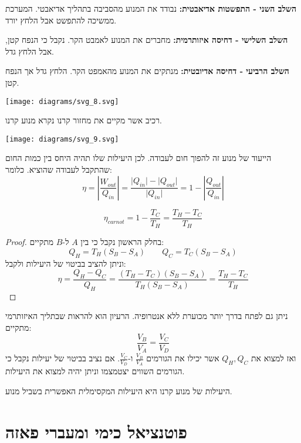 \documentclass{tstextbook}
\begin{document}
\textbf{השלב השני - התפשטות אדיאבטית:}
נבודד את המנוע מהסביבה בתהליך אדיאבטי. המערכת ממשיכה להתפשט אבל הלחץ יורד.

\textbf{השלב השלישי - דחיסה איזותרמית:}
מחברים את המנוע לאמבט הקר. נקבל כי הנפח קטן, אבל הלחץ גדל.

\textbf{השלב הרביעי - דחיסה אדיובטית:}
מנתקים את המנוע מהאמפט הקר. הלחץ גדל אך הנפח קטן.

\texttt{[image: diagrams/svg\_8.svg]}
\begin{definition}
רכיב אשר מקיים את מחזור קרנו נקרא מנוע קרנו.

\end{definition}
\texttt{[image: diagrams/svg\_9.svg]}
\begin{definition}[יעילות]
הייעוד של מנוע זה להפוך חום לעבודה. לכן היעילות שלו תהיה היחס בין כמות החום שהתקבל לעבודה שהוציא. כלומר:
$$\eta = \left\lvert  \frac{W_{out}}{Q_{in}}  \right\rvert = \frac{\lvert Q_{in} \rvert -\lvert Q_{out} \rvert}{\lvert Q_{in} \rvert }=1-\left\lvert  \frac{Q_{out}}{Q_{in}}  \right\rvert  $$

\end{definition}
\begin{proposition}
$$\eta_{carnot}=1-\frac{T_{C}}{T_{H}}=\frac{T_{H}-T_{C}}{T_{H}}$$

\end{proposition}
\begin{proof}
בחלק הראשון נקבל כי בין \(A\) ל-\(B\) מתקיים:
$$Q_{H}=T_{H}(S_{B}-S_{A}) \qquad Q_{C}=T_{C}(S_{B}-S_{A})$$
וניתן להציב בביטוי של היעילות ולקבל:
$$\eta = \frac{Q_{H} - Q_{C}}{Q_{H}}= \frac{(T_{H}-T_{C})(S_{B}-S_{A})}{T_{H}(S_{B}-S_{A})}=\frac{T_{H}-T_{C}}{T_{H}}$$

\end{proof}
\begin{remark}
ניתן גם לפתח בדרך יותר מכוערת ללא אנטרופיה. הרעיון הוא להראות שבתליך האיזותרמי מתקיים:
$$\frac{V_{B}}{V_{A}}=\frac{V_{C}}{V_{D}}$$
ואז למצוא את \(Q_{H},Q_{C}\) אשר יכילו את הגורמים \(\frac{V_{B}}{V_{A}}\) ו-\(\frac{V_{C}}{V_{D}}\). אם נציב בביטוי של יעילות נקבל כי הגורמים השווים יצטמצמו וניתן יהיה למצוא את היעילות.

\end{remark}
\begin{theorem}
היעילות של מנוע קרנו היא היעילות המקסימלית האפשרית בשביל מנוע.

\end{theorem}
\chapter{פוטנציאל כימי ומעברי פאזה}
\end{document}
